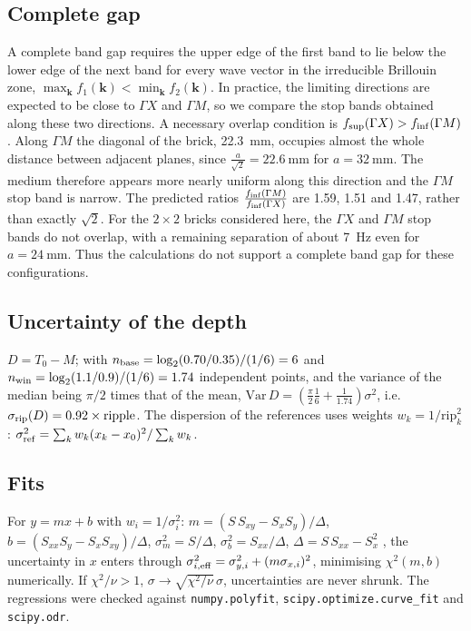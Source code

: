 \documentclass[9pt,a4paper,twocolumn]{extarticle}
\newcommand{\GX}{\ensuremath{\Gamma X}}
\newcommand{\GM}{\ensuremath{\Gamma M}}
\begin{document}
\subsection*{Complete gap}
A complete band gap requires the upper edge of the first band to lie below the lower edge of the next band for every wave vector in the irreducible Brillouin zone, $\max_{\mathbf k} f_1(\mathbf k) < \min_{\mathbf k} f_2(\mathbf k)$. In practice, the limiting directions are expected to be close to \GX{} and \GM{}, so we compare the stop bands obtained along these two directions. A necessary overlap condition is $f_{\rm sup}(\GX) > f_{\rm inf}(\GM)$. Along \GM{} the diagonal of the brick, \SI{22.3}{\milli\metre}, occupies almost the whole distance between adjacent planes, since $\frac{a}{\sqrt{2}}=\SI{22.6}{\milli\metre}$ for $a=\SI{32}{\milli\metre}$. The medium therefore appears more nearly uniform along this direction and the \GM{} stop band is narrow. The predicted ratios $\frac{f_{\rm inf}(\GM)}{f_{\rm inf}(\GX)}$ are 1.59, 1.51 and 1.47, rather than exactly \(\sqrt{2}\). For the \(2\times2\) bricks considered here, the \GX{} and \GM{} stop bands do not overlap, with a remaining separation of about \SI{7}{\hertz} even for $a=\SI{24}{\milli\metre}$. Thus the calculations do not support a complete band gap for these configurations.

\subsection*{Uncertainty of the depth}
$D=T_0-M$; with $n_{\rm base}=\log_2(0.70/0.35)/(1/6)=6$ and $n_{\rm win}=\log_2(1.1/0.9)/(1/6)=1.74$ independent points, and the variance of the median being $\pi/2$ times that of the mean, $\mathrm{Var}\,D=\left(\frac\pi2\frac16+\frac1{1.74}\right)\sigma^2$, i.e.\ $\sigma_{\rm rip}(D)=0.92\times\mathrm{ripple}$. The dispersion of the references uses weights $w_k=1/\mathrm{rip}_k^2$: $\sigma_{\rm ref}^2=\sum_kw_k(x_k-x_0)^2/\sum_kw_k$.

\subsection*{Fits}
For $y=mx+b$ with $w_i=1/\sigma_i^2$: $m=(S\,S_{xy}-S_xS_y)/\Delta$, $b=(S_{xx}S_y-S_xS_{xy})/\Delta$, $\sigma_m^2=S/\Delta$, $\sigma_b^2=S_{xx}/\Delta$, $\Delta=S\,S_{xx}-S_x^2$ \cite{pdg}, the uncertainty in $x$ enters through $\sigma_{i,\rm eff}^2=\sigma_{y,i}^2+(m\sigma_{x,i})^2$, minimising $\chi^2(m,b)$ numerically. If $\chi^2/\nu>1$, $\sigma\to\sqrt{\chi^2/\nu}\,\sigma$, uncertainties are never shrunk. The regressions were checked against \texttt{numpy.polyfit}, \texttt{scipy.optimize.curve\_fit} and \texttt{scipy.odr}.
\end{document}
